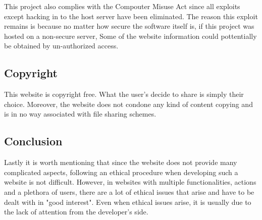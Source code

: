 This project also complies with the Compouter Misuse Act since all exploits except hacking in to the host server have been eliminated. The reason this exploit remains is because no matter how secure the software itself is, if this project was hosted on a non-secure server, Some of the website information could pottentially be obtained by un-authorized access.

\subsection{Copyright}
This website is copyright free. What the user's decide to share is simply their choice. Moreover, the website does not condone any kind of content copying and is in no way associated with file sharing schemes.

\subsection{Conclusion}

Lastly it is worth mentioning that since the website does not provide many complicated aspects, following an ethical procedure when developing such a website is not difficult. However, in websites with multiple functionalities, actions and a plethora of users, there are a lot of ethical issues that arise and have to be dealt with in "good interest". Even when ethical issues arise, it is usually due to the lack of attention from the developer's side.
